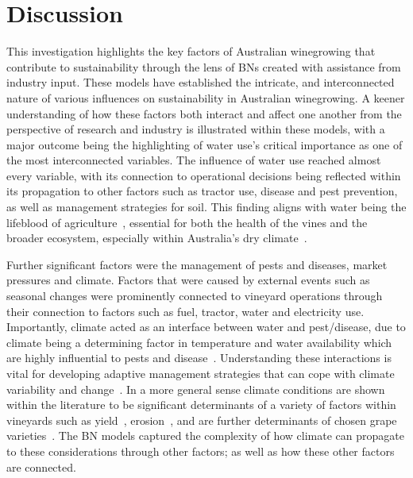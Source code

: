 
\section{Discussion}
This investigation highlights the key factors of Australian winegrowing that contribute to  sustainability through the lens of BNs created with assistance from industry input. These models have established the intricate, and interconnected nature of various influences on sustainability in Australian winegrowing. A keener understanding of how these factors both interact and affect one another from the perspective of research and industry is illustrated within these models, with a major outcome being the highlighting of water use's critical importance as one of the most interconnected variables.
The influence of water use reached almost every variable, with its connection to operational decisions being reflected within its propagation to other factors such as tractor use, disease and pest prevention, as well as management strategies for soil. This finding aligns with water being the lifeblood of agriculture~\cite{chawlaWaterProductivityAgriculture2023}, essential for both the health of the vines and the broader ecosystem, especially within Australia's dry climate~\cite{australianbureauofstatisticsWaterUseAustralian2021}.

Further significant factors were the management of pests and diseases, market pressures and climate. Factors that were caused by external events such as seasonal changes were prominently connected to vineyard operations through their connection to factors such as fuel, tractor, water and electricity use. Importantly, climate acted as an interface between water and pest/disease, due to climate being a determining factor in temperature and water availability which are highly influential to pests and disease~\cite{boisClimateVsGrapevine2017}. Understanding these interactions is vital for developing adaptive management strategies that can cope with climate variability and change~\cite{agostaRegionalClimateVariability2012,alsafadiFutureScenariosBioclimatic2023,barriguinhaVineyardYieldEstimation2021,sharmaChapterImpactClimate2014}. In a more general sense climate conditions are shown within the literature to be significant determinants of a variety of factors within vineyards such as yield~\cite{barriguinhaVineyardYieldEstimation2021,antonComparativeStudyRisk2012}, erosion~\cite{biddoccuEvaluationSoilErosion2020,doi:10.1177/0309133319861833}, and are further determinants of chosen grape varieties~\cite{topferGrapeVarietiesAre2022, petriashviliImpactClimateChange2023}. The BN models captured the complexity of how climate can propagate to these considerations through other factors; as well as how these other factors are connected.

